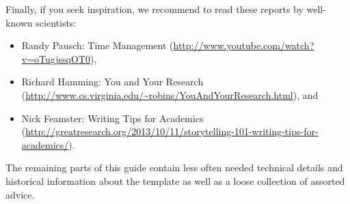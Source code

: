 Finally, if you seek inspiration, we recommend to read these reports by well-known scientists:
\begin{itemize}
\item Randy Pausch: Time Management (\url{http://www.youtube.com/watch?v=oTugjssqOT0}),
\item Richard Hamming: You and Your Research (\url{http://www.cs.virginia.edu/~robins/YouAndYourResearch.html}), and
\item Nick Feamster: Writing Tips for Academics (\url{http://greatresearch.org/2013/10/11/storytelling-101-writing-tips-for-academics/}).
\end{itemize}

The remaining parts of this guide contain less often needed technical details and historical information about the template as well as a loose collection of assorted advice.